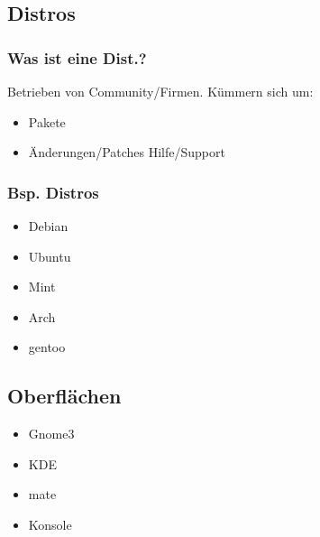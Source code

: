 
\subsection{Distros}
\begin{frame}
\frametitle{Was ist eine Dist.?}
Betrieben von Community/Firmen.
Kümmern sich um: 
\begin{itemize}
 \item Pakete
 \item Änderungen/Patches
 \itme Hilfe/Support
\end{itemize}
 
\end{frame}

\begin{frame}
\frametitle{Bsp. Distros}
\begin{itemize}
\item Debian
\item Ubuntu
\item Mint
\item Arch
\item gentoo
\end{itemize}
\end{frame}

\subsection{Oberflächen}
\begin{frame}
\begin{itemize}
\item Gnome3
\item KDE
\item mate
\item Konsole
\end{itemize}
\end{frame}


